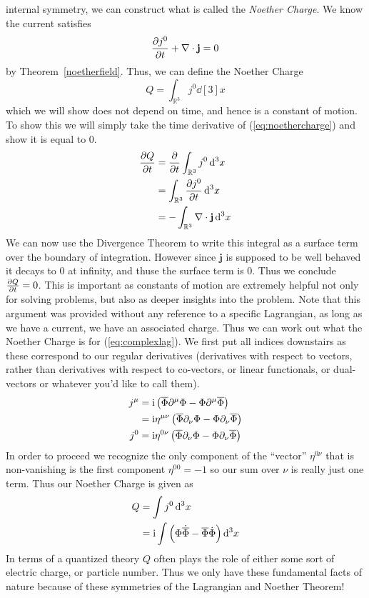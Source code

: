 internal symmetry, we can construct what is called the \textit{Noether Charge}.
We know the current satisfies
\begin{equation}
    \pdv{j^0}{t} + \nabla\cdot\mathbf{j} = 0
\end{equation}
by Theorem~\ref{noetherfield}. Thus, we can define the Noether Charge
\begin{equation}\label{eq:noethercharge}
    Q = \int_{\mathbb{R}^3}j^0\dd[3]{x}
\end{equation}
which we will show does not depend on time, and hence is a constant of motion.
To show this we will simply take the time derivative of (\ref{eq:noethercharge})
and show it is equal to 0.
\begin{align}
    \pdv{Q}{t} & = \pdv{t}\int_{\mathbb{R}^3}j^0\dd[3]{x}             \\
               & = \int_{\mathbb{R}^3}\pdv{j^0}{t}\dd[3]{x}           \\
               & = -\int_{\mathbb{R}^3}\nabla\cdot\mathbf{j}\dd[3]{x}
\end{align}
We can now use the Divergence Theorem to write this integral as a surface term
over the boundary of integration. However since \(\mathbf{j}\) is supposed to be
well behaved it decays to 0 at infinity, and thuse the surface term is 0. Thus
we conclude \(\pdv{Q}{t} = 0\). This is important as constants of motion
are extremely helpful not only for solving problems, but also as deeper insights
into the problem. Note that this argument was provided without any reference to
a specific Lagrangian, as long as we have a current, we have an associated
charge. Thus we can work out what the Noether Charge is for
(\ref{eq:complexlag}). We first put all indices downstairs as these correspond
to our regular derivatives (derivatives with respect to vectors, rather than
derivatives with respect to co-vectors, or linear functionals, or dual-vectors
or whatever you'd like to call them).
\begin{align}
    j^\mu & = \mathrm{i}\left(\overline{\Phi}\partial^\mu\Phi - \Phi\partial^\mu\overline{\Phi}\right)              \\
          & = \mathrm{i}\eta^{\mu\nu}\left(\overline{\Phi}\partial_\nu\Phi - \Phi\partial_\nu\overline{\Phi}\right) \\
    j^0   & = \mathrm{i}\eta^{0\nu}\left(\overline{\Phi}\partial_\nu\Phi - \Phi\partial_\nu\overline{\Phi}\right)
\end{align}
In order to proceed we recognize the only component of the ``vector''
\(\eta^{0\nu}\) that is non-vanishing is the first component \(\eta^{00} = -1\)
so our sum over \(\nu\) is really just one term. Thus our Noether Charge is
given as
\begin{align}
    Q & = \int j^0\dd[3]{x}                                                                                   \\
      & = \mathrm{i}\int\left(\Phi\dot{\overline{\Phi}} - \overline{\Phi}\dot{\Phi}\right)\dd[3]{x}\label{eq:charge}
\end{align}
In terms of a quantized theory \(Q\) often plays the role of either some sort of
electric charge, or particle number. Thus we only have these fundamental facts
of nature because of these symmetries of the Lagrangian and Noether Theorem!

